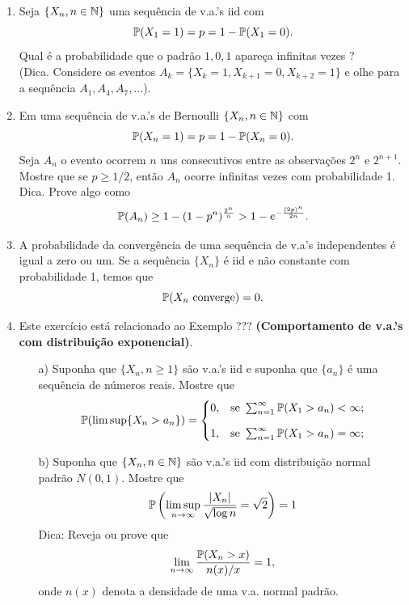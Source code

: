 \begin{enumerate}[leftmargin=*]
\item 
Seja $\{X_n, n\in\N\}$ uma sequência de v.a.'s iid com
	\[
		\P(X_1=1)=p=1-\P(X_1=0).
	\]
Qual é a probabilidade que o padrão $1,0,1$ apareça
infinitas vezes ? 
\\
(Dica. Considere os eventos $A_k=\{X_k=1,X_{k+1}=0,X_{k+2}=1\}$ e 
olhe para a sequência $A_1,A_4,A_7,\ldots$).



\item 
Em uma sequência de v.a.'s de Bernoulli $\{X_n, n\in\N\}$
com 
	\[
		\P(X_n=1)=p=1-\P(X_n=0).
	\]
Seja $A_n$ o evento ocorrem $n$ uns consecutivos entre as 
observações $2^n$ e $2^{n+1}$. Mostre que se $p \geq 1/2$,
então $A_n$ ocorre infinitas vezes com probabilidade 1.
\\
Dica. Prove algo como 
\[
	\P(A_n) \geq 
	1-(1-p^n)^{\frac{2^n}{n}}
	>
	1-e^{-\frac{(2p)^n}{2n}}.		
\]


\item 
A probabilidade da convergência de uma sequência de 
v.a's independentes é igual a zero ou um. 
Se a sequência $\{X_n\}$ é iid e não constante 
com probabilidade 1, temos que 
	\[
		\P(X_n \ \text{converge}) =0.
	\]  








\item
Este exercício está relacionado ao Exemplo ???
{\bf (Comportamento de v.a.'s com distribuição exponencial)}.
	\begin{itemize}


		\item[a)]
		Suponha que $\{X_n,n\geq 1\}$ são v.a.'s iid e 
		suponha que $\{a_n\}$ é uma sequência de números 
		reais. Mostre que 
			\[
				\P(\limsup \{X_n>a_n\})
				=
				\begin{cases}
					0,&\text{se}\ \sum_{n=1}^{\infty} \P(X_1>a_n)<\infty;
					\\[0.3cm]
					1,&\text{se}\ \sum_{n=1}^{\infty} \P(X_1>a_n)=\infty;
				\end{cases}
			\]


		
		\item[b)] 
		Suponha que $\{X_n,n\in\N\}$ são v.a.'s iid com distribuição 
		normal padrão $N(0,1)$. Mostre que 
			\[
				\P\left( 
				\limsup_{n\to\infty} \frac{|X_n|}{\sqrt{\log n}}
				=\sqrt{2}  
				\right)
				=1
			\]
		Dica: Reveja ou prove que 
			\[
				\lim_{n\to\infty}
				\frac{\P(X_n>x)}{n(x)/x}=1,
			\]
		onde $n(x)$ denota a densidade de uma v.a. normal
		padrão.




\end{itemize}
\end{enumerate}
